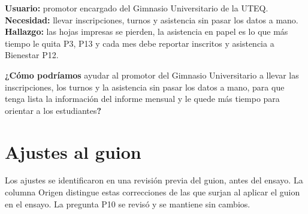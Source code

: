 \documentclass[12pt,a4paper]{article}
\begin{document}
\textbf{Usuario:} promotor encargado del Gimnasio Universitario de la UTEQ.\\
\textbf{Necesidad:} llevar inscripciones, turnos y asistencia sin pasar los datos a mano.\\
\textbf{Hallazgo:} las hojas impresas se pierden, la asistencia en papel es lo que más tiempo le quita P3, P13 y cada mes debe reportar inscritos y asistencia a Bienestar P12.

\textbf{¿Cómo podríamos} ayudar al promotor del Gimnasio Universitario a llevar las inscripciones, los turnos y la asistencia sin pasar los datos a mano, para que tenga lista la información del informe mensual y le quede más tiempo para orientar a los estudiantes\textbf{?}

\section{Ajustes al guion}

Los ajustes se identificaron en una revisión previa del guion, antes del ensayo.
La columna Origen distingue estas correcciones de las que surjan al aplicar
el guion en el ensayo. La pregunta P10 se revisó y se mantiene sin cambios.
\end{document}
